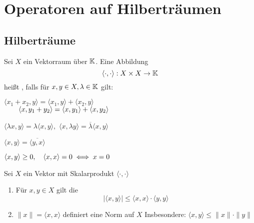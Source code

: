 

\chapter*{Operatoren auf Hilberträumen}  \setcounter{section}{14}



\section{Hilberträume}



\begin{definition} \label{def:15.1-Skalarprodukt}
	Sei $X$ ein Vektorraum über $\mathbb{K}$. Eine Abbildung
	\[ \langle \cdot, \cdot \rangle : X \times X \rightarrow \mathbb{K} \]
	hei{\ss}t , falls für $x, y \in X, \lambda \in \mathbb{K}$ gilt:
	\begin{description}
	 	\label{def:15.1i}
	 	\item[$\hspace{0.5cm} (S1) \hspace{0.1cm} $] $\langle x_{1} + x_{2}, y \rangle = \langle x_{1}, y \rangle + \langle x_{2}, y \rangle$ \\
			 $~\hspace{0.6cm} \langle x, y_{1} + y_{2} \rangle = \langle x, y_{1} \rangle + \langle x, y_{2} \rangle$
 		\label{def:15.1ii}
	 	\item[$\hspace{0.5cm} (S2) \hspace{0.1cm} $] $\langle \lambda x, y \rangle = \lambda \langle x, y \rangle,$ $\langle x, \lambda y \rangle = \overline{\lambda} \langle x, y \rangle$
 		\label{def:15.1iii}
	 	\item[$\hspace{0.5cm} (S3) \hspace{0.1cm} $] $\langle x, y \rangle = \overline{\langle y, x \rangle }$
 		\label{def:15.1iv}
	 	\item[$\hspace{0.5cm} (S4) \hspace{0.1cm} $] $\langle x, y \rangle \geq 0, \quad \langle x, x \rangle = 0 \iff x = 0$
	\end{description}
\end{definition}


\begin{prop} \label{prop:15.2}
	Sei $X$ ein Vektor mit Skalarprodukt $\langle \cdot, \cdot \rangle$
	\begin{enumerate}[label=\alph*\upshape)] \label{prop:15.2a}
		\item Für $x, y \in X$ gilt die 
			\[ | \langle x, y \rangle | \leq \langle x, x \rangle \cdot \langle y, y \rangle \] \label{prop:15.2b}
		\item $\| x \| = \langle x, x \rangle$ definiert eine Norm auf $X$
			Insbesondere: $\langle x, y \rangle \leq \| x \| \cdot \| y \|$
	\end{enumerate}	
\end{prop}

